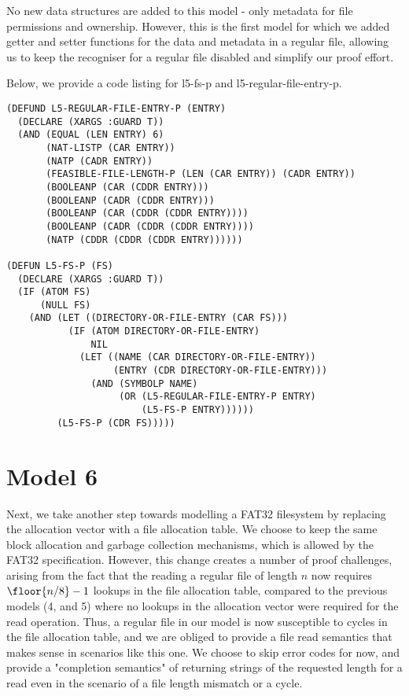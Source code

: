 \documentclass[format=sigconf,review=true]{acmart}
\begin{document}
No new data structures are added to this model - only metadata for
file permissions and ownership. However, this is the first model for
which we added getter and setter functions for the data and metadata
in a regular file, allowing us to keep the recogniser for a regular
file disabled and simplify our proof effort.

Below, we provide a code listing for l5-fs-p and
l5-regular-file-entry-p.

\begin{lstlisting}
(DEFUND L5-REGULAR-FILE-ENTRY-P (ENTRY)
  (DECLARE (XARGS :GUARD T))
  (AND (EQUAL (LEN ENTRY) 6)
       (NAT-LISTP (CAR ENTRY))
       (NATP (CADR ENTRY))
       (FEASIBLE-FILE-LENGTH-P (LEN (CAR ENTRY)) (CADR ENTRY))
       (BOOLEANP (CAR (CDDR ENTRY)))
       (BOOLEANP (CADR (CDDR ENTRY)))
       (BOOLEANP (CAR (CDDR (CDDR ENTRY))))
       (BOOLEANP (CADR (CDDR (CDDR ENTRY))))
       (NATP (CDDR (CDDR (CDDR ENTRY))))))

(DEFUN L5-FS-P (FS)
  (DECLARE (XARGS :GUARD T))
  (IF (ATOM FS)
      (NULL FS)
    (AND (LET ((DIRECTORY-OR-FILE-ENTRY (CAR FS)))
           (IF (ATOM DIRECTORY-OR-FILE-ENTRY)
               NIL
             (LET ((NAME (CAR DIRECTORY-OR-FILE-ENTRY))
                   (ENTRY (CDR DIRECTORY-OR-FILE-ENTRY)))
               (AND (SYMBOLP NAME)
                    (OR (L5-REGULAR-FILE-ENTRY-P ENTRY)
                        (L5-FS-P ENTRY))))))
         (L5-FS-P (CDR FS)))))
\end{lstlisting}

\section{Model 6}
Next, we take another step towards modelling a FAT32 filesystem by
replacing the allocation vector with a file allocation table. We
choose to keep the same block allocation and garbage collection
mechanisms, which is allowed by the FAT32
specification\cite{}. However, this change creates a number of proof
challenges, arising from the fact that the reading a regular file of
length $ n $ now requires $ \floor{n/8} - 1 $ lookups in the file
allocation table, compared to the previous models (4, and 5) where no
lookups in the allocation vector were required for the read
operation. Thus, a regular file in our model is now susceptible to
cycles in the file allocation table, and we are obliged to provide a
file read semantics that makes sense in scenarios like this one. We
choose to skip error codes for now, and provide a "completion
semantics" of returning strings of the requested length for a read
even in the scenario of a file length mismatch or a cycle.
\end{document}
